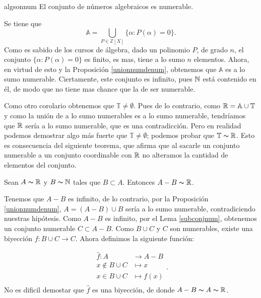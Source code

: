\begin{corolario}{algsonnum}
El conjunto de números algebraicos es numerable.
\end{corolario}
\begin{demo} Se tiene que
\[\mathbb{A}=\bigcup_{P\in\mathbb{Z}[X]}\{\alpha:P(\alpha)=0\}.\]
Como es sabido de los cursos de álgebra, dado un polinomio $P$,
de grado $n$, el conjunto $\{\alpha:P(\alpha)=0\}$ es finito, es
mas, tiene a lo sumo $n$ elementos. Ahora, en virtud de esto y la
Proposición \vref{unionnumdenum}, obtenemos que $\mathbb{A}$ es
a lo sumo numerable. Ciertamente, este conjunto es infinito, pues
$\mathbb{N}$ está contenido en él, de modo que no tiene mas chance
que la de ser numerable.
\end{demo}

Como otro corolario  obtenemos que
$\mathbb{T}\neq\emptyset$. Pues de lo contrario, como
$\mathbb{R}=\mathbb{A}\cup\mathbb{T}$ y como la unión de a lo sumo
numerables es a lo sumo numerable, tendríamos que $\mathbb{R}$
sería a lo sumo numerable, que es una contradicción. Pero
en realidad podemos demostrar algo más fuerte  que
$\mathbb{T}\neq\emptyset$; podemos probar que
$\mathbb{T}\thicksim\mathbb{R}$. Esto es consecuencia del siguiente
teorema, que afirma que al sacarle un conjunto numerable a un
conjunto coordinable con $\mathbb{R}$ no alteramos la cantidad de
elementos del conjunto.
\begin{lema}{} Sean $A\thicksim\mathbb{R}$ y $B\thicksim\mathbb{N}$ tales que
$B\subset A$. Entonces $A-B\thicksim\mathbb{R}$.
\end{lema}
\begin{demo} Tenemos que $A-B$ es infinito, de lo contrario, por la
Proposición \vref{unionnumdenum}, $A=(A-B)\cup B$ sería a
lo sumo numerable, contradiciendo nuestras hipótesis. Como $A-B$
es infinito, por el Lema \vref{subconjnum}, obtenemos un conjunto
numerable $C\subset A-B$. Como $B\cup C$ y $C$ son numerables,
existe una biyección $f:B\cup C\longrightarrow C$. Ahora
definimos la siguiente función:

\[
  \begin{split}
       \hat{f}:A&\longrightarrow A-B\\
       x\notin B\cup C&\longmapsto x\\
       x\in B\cup C&\longmapsto f(x)\\
  \end{split}.
\]
No es dificil demostar que $\hat{f}$ es una biyección, de donde
$A-B\thicksim A\thicksim\mathbb{R}$.
\end{demo}

